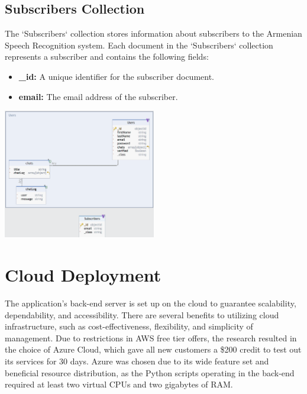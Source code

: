 \documentclass[conference]{IEEEtran}
\begin{document}
\subsection{Subscribers Collection}

The `Subscribers` collection stores information about subscribers to the Armenian Speech Recognition system. Each document in the `Subscribers` collection represents a subscriber and contains the following fields:

\begin{itemize}
    \item \textbf{\_id:} A unique identifier for the subscriber document.
    \item \textbf{email:} The email address of the subscriber.
\end{itemize}

\vspace{1em} %
\begin{center}
    \centering
    \includegraphics[width=0.5\textwidth]{DB_Structure.png}
    \label{fig:database_structure}
\end{center}
\vspace{1em} %

\section{Cloud Deployment}

The application's back-end server is set up on the cloud to guarantee scalability, dependability, and accessibility. There are several benefits to utilizing cloud infrastructure, such as cost-effectiveness, flexibility, and simplicity of management.
Due to restrictions in AWS free tier offers, the research resulted in the choice of Azure Cloud, which gave all new customers a \$200 credit to test out its services for 30 days. Azure was chosen due to its wide feature set and beneficial resource distribution, as the Python scripts operating in the back-end required at least two virtual CPUs and two gigabytes of RAM.
\end{document}
